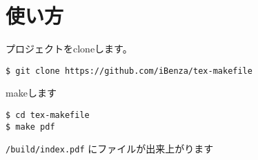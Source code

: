 \section{使い方}

プロジェクトをcloneします。

\begin{lstlisting}
$ git clone https://github.com/iBenza/tex-makefile
\end{lstlisting}

makeします

\begin{lstlisting}
$ cd tex-makefile
$ make pdf
\end{lstlisting}

\texttt{/build/index.pdf} にファイルが出来上がります
